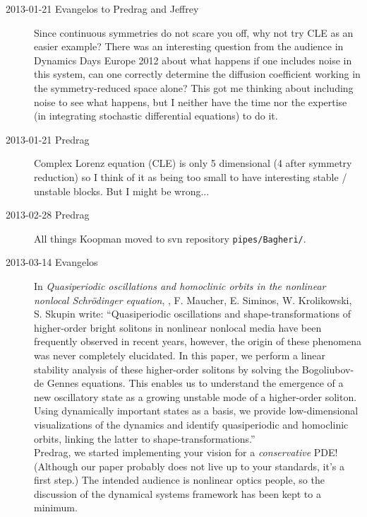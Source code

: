 \begin{description}
\item[2013-01-21 Evangelos to Predrag and Jeffrey] Since continuous symmetries do not scare you
off, why not try CLE as an easier example? There was an interesting question from the
audience in Dynamics Days Europe 2012 about what happens if one includes
noise in this system,
can one correctly determine the diffusion coefficient working in the symmetry-reduced space alone?
This got me thinking about including noise to see what happens, but I neither have the time
nor the expertise (in integrating stochastic differential equations) to do it.

\item[2013-01-21  Predrag] Complex Lorenz equation (CLE)
is only 5 dimensional (4 after symmetry reduction) so I think of it
as being too small to have interesting stable / unstable blocks. But
I might be wrong...


\item[2013-02-28  Predrag] All things Koopman moved to svn repository
\texttt{pipes/Bagheri/}.

\item[2013-03-14 Evangelos] In
\emph{Quasiperiodic oscillations and homoclinic orbits in the nonlinear nonlocal
Schr\"odinger equation}, ,
F. Maucher, E. Siminos, W. Krolikowski, S. Skupin write:
``Quasiperiodic oscillations and shape-transformations of higher-order
bright solitons in nonlinear nonlocal media have been frequently observed
in recent years, however, the origin of these phenomena was never completely
elucidated. In this paper, we perform a linear stability analysis of these
higher-order solitons by solving the Bogoliubov-de Gennes equations.
This enables us to understand the emergence of a new oscillatory state
as a growing unstable mode of a higher-order soliton. Using dynamically
important states as a basis, we provide low-dimensional visualizations
of the dynamics and identify quasiperiodic and homoclinic orbits,
linking the latter to shape-transformations.'' \\

Predrag,  we started implementing your vision
for a \emph{conservative} PDE! (Although our paper probably does not live up to
your standards, it's a first step.)
The intended audience is nonlinear optics people, so the discussion of the
dynamical systems framework has been kept to a minimum.


\end{description}
